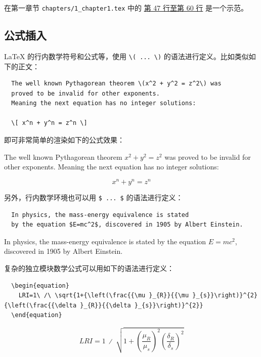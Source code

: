 在第一章节 \texttt{chapters/1\_chapter1.tex} 中的 \href{https://github.com/spencerwooo/BIThesis/blob/master/graduation-thesis/chapters/1_chapter1.tex#L47-L60}{第 47 行至第 60 行} 是一个示范。

\subsection{公式插入}

{\LaTeX} 的行内数学符号和公式等，使用 \verb|\( ... \)| 的语法进行定义。比如类似如下的正文：

\begin{verbatim}
  The well known Pythagorean theorem \(x^2 + y^2 = z^2\) was
  proved to be invalid for other exponents.
  Meaning the next equation has no integer solutions:

  \[ x^n + y^n = z^n \]
\end{verbatim}

即可非常简单的渲染如下的公式效果：

The well known Pythagorean theorem \(x^2 + y^2 = z^2\) was proved to be invalid for other exponents. Meaning the next equation has no integer solutions:

\[ x^n + y^n = z^n \]

另外，行内数学环境也可以用 \verb|$ ... $| 的语法进行定义：

\begin{verbatim}
  In physics, the mass-energy equivalence is stated
  by the equation $E=mc^2$, discovered in 1905 by Albert Einstein.
\end{verbatim}

In physics, the mass-energy equivalence is stated
by the equation $E=mc^2$, discovered in 1905 by Albert Einstein.

复杂的独立模块数学公式可以用如下的语法进行定义：

\begin{verbatim}
  \begin{equation}
    LRI=1\ ∕\ \sqrt{1+{\left(\frac{{\mu }_{R}}{{\mu }_{s}}\right)}^{2}{\left(\frac{{\delta }_{R}}{{\delta }_{s}}\right)}^{2}}
  \end{equation}
\end{verbatim}

\begin{equation}
  LRI=1\ ∕\ \sqrt{1+{\left(\frac{{\mu }_{R}}{{\mu }_{s}}\right)}^{2}{\left(\frac{{\delta }_{R}}{{\delta }_{s}}\right)}^{2}}
\end{equation}

